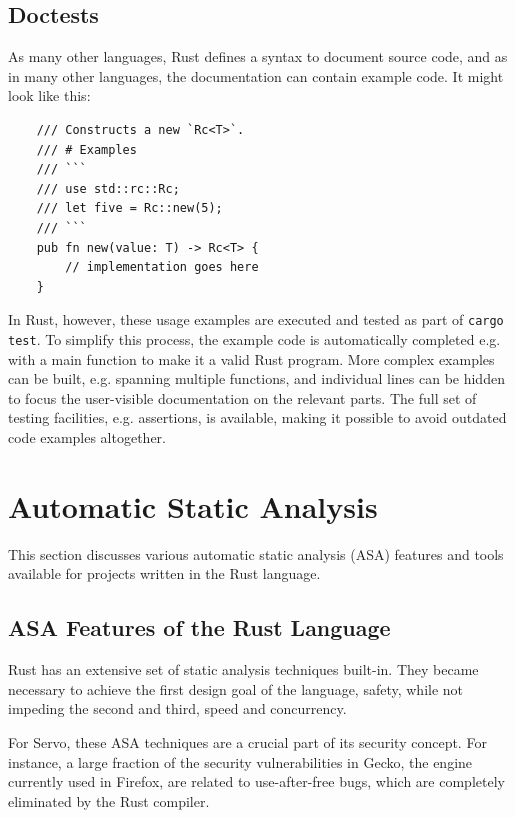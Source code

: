 \documentclass{scrartcl}
\begin{document}
\subsection{Doctests}

As many other languages, Rust defines a syntax to document source code, and as in many other languages, the documentation can contain example code. It might look like this:

\small {
    \begin{verbatim}
    /// Constructs a new `Rc<T>`.
    /// # Examples
    /// ```
    /// use std::rc::Rc;
    /// let five = Rc::new(5);
    /// ```
    pub fn new(value: T) -> Rc<T> {
        // implementation goes here
    }
    \end{verbatim}
}

In Rust, however, these usage examples are executed and tested as part of \texttt{cargo test}. To simplify this process, the example code is automatically completed e.g. with a main function to make it a valid Rust program. More complex examples can be built, e.g. spanning multiple functions, and individual lines can be hidden to focus the user-visible documentation on the relevant parts. The full set of testing facilities, e.g. assertions, is available, making it possible to avoid outdated code examples altogether.


\newpage


\section{Automatic Static Analysis}

This section discusses various automatic static analysis (ASA) features and tools available for projects written in the Rust language.

\subsection{ASA Features of the Rust Language} \label{rust_features}

Rust has an extensive set of static analysis techniques built-in. They became necessary to achieve the first design goal of the language, safety, while not impeding the second and third, speed and concurrency.

For Servo, these ASA techniques are a crucial part of its security concept. For instance, a large fraction of the security vulnerabilities in Gecko, the engine currently used in Firefox, are related to use-after-free bugs, which are completely eliminated by the Rust compiler.
\end{document}
